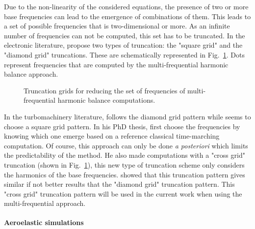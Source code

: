 Due to the non-linearity of the considered
equations, the presence 
of two or more base frequencies can lead to
the emergence of combinations of them.
This leads to a set of possible frequencies that 
is two-dimensional or more. As an infinite number of frequencies
can not be computed, this set 
has to be truncated. In the electronic literature,
\citet{Kundert1988} propose two types of truncation:
the "square grid" and the "diamond grid" truncations.
These are schematically represented in Fig.~\ref{fig:dream_hb_truncation}.
Dots represent frequencies that are computed by the multi-frequential
harmonic balance approach.
\begin{figure}[htp]
  \centering
  \caption{Truncation grids for reducing the set of frequencies of multi-frequential
  harmonic balance computations.}
  \label{fig:dream_hb_truncation}
\end{figure}
In the turbomachinery literature, \citet{Gopinath2007} follows the
diamond grid pattern while \citet{Ekici2007} seems to choose a
square grid pattern. In his PhD thesis, \citet{ThesisGuedeney}
first choose the frequencies by knowing which one emerge based on
a reference classical time-marching computation. Of course,
this approach can only be done \emph{a posteriori} which limits
the predictability of the method. He
also made computations with a "cross grid" truncation 
(shown in Fig.~\ref{fig:dream_hb_truncation}), this new type 
of truncation scheme only considers the harmonics of the
base frequencies. \citet{ThesisGuedeney} showed that this
truncation pattern gives
similar if not better results that the
"diamond grid" truncation pattern.  This "cross grid"
truncation pattern will be used in the current work
when using the multi-frequential approach.

\paragraph{Aeroelastic simulations}

